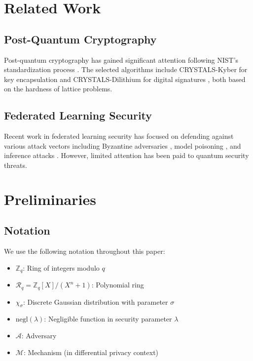 \documentclass[journal]{IEEEtran}
\begin{document}
\section{Related Work}

\subsection{Post-Quantum Cryptography}

Post-quantum cryptography has gained significant attention following NIST's standardization process \cite{nist2022pqc}. The selected algorithms include CRYSTALS-Kyber for key encapsulation \cite{bos2018crystals} and CRYSTALS-Dilithium for digital signatures \cite{ducas2018crystals}, both based on the hardness of lattice problems.

\subsection{Federated Learning Security}

Recent work in federated learning security has focused on defending against various attack vectors including Byzantine adversaries \cite{blanchard2017machine}, model poisoning \cite{bagdasaryan2020backdoor}, and inference attacks \cite{melis2019exploiting}. However, limited attention has been paid to quantum security threats.

\section{Preliminaries}

\subsection{Notation}

We use the following notation throughout this paper:
\begin{itemize}
\item $\mathbb{Z}_q$: Ring of integers modulo $q$
\item $\mathcal{R}_q = \mathbb{Z}_q[X]/(X^n + 1)$: Polynomial ring
\item $\chi_\sigma$: Discrete Gaussian distribution with parameter $\sigma$
\item $\text{negl}(\lambda)$: Negligible function in security parameter $\lambda$
\item $\mathcal{A}$: Adversary
\item $\mathcal{M}$: Mechanism (in differential privacy context)
\end{itemize}
\end{document}
